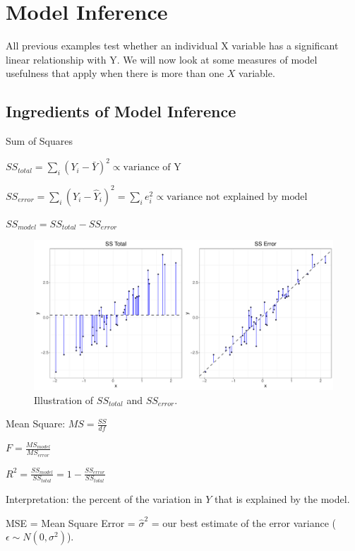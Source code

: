 \documentclass[12pt]{notes}
\begin{document}
\nspace
{}

\begin{minipage}[l][2cm][c]{\textwidth}
\end{minipage}

\section*{Model Inference}
All previous examples test whether an individual X variable has a significant linear relationship with Y. We will now look at some measures of model usefulness that apply when there is more than one $X$ variable. 

\subsection*{Ingredients of Model Inference}
\bi
\item Sum of Squares
\bi
\item $SS_{total} = \sum_i\left(Y_i - \bar{Y}\right)^2 \propto \text{variance of Y}$
\item $SS_{error} = \sum_i\left(Y_i - \hat{Y}_i\right)^2 = \sum_ie_i^2 \propto \text{variance not explained by model}$
\item $SS_{model} = SS_{total} - SS_{error}$
\ei
\ei

\begin{figure}[H]
\includegraphics[width=\textwidth]{figures/module2/ssError.pdf}
\caption{Illustration of $SS_{total}$ and $SS_{error}$.}
\end{figure}

\bi
\item Mean Square: $MS = \frac{SS}{df}$ 
\item $F = \frac{MS_{model}}{MS_{error}}$
\item $R^2 = \frac{SS_{model}}{SS_{total}} = 1 - \frac{SS_{error}}{SS_{total}}$
\bi
\item Interpretation: the percent of the variation in $Y$ that is explained by the model. 
\ei
\item MSE = Mean Square Error = $\hat{\sigma}^2$ = our best estimate of the error variance ($\epsilon \sim N(0, \sigma^2)$).
\ei
\end{document}
